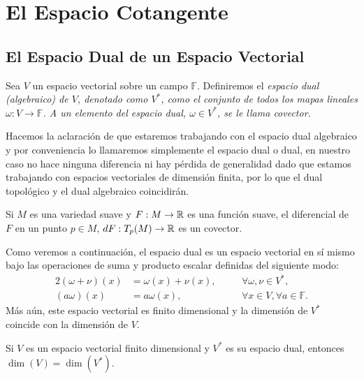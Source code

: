 \section{El Espacio Cotangente}\label{Sección: Espacio Cotangente}
\subsection{El Espacio Dual de un Espacio Vectorial}

\begin{definition}
	Sea $V$ un espacio vectorial sobre un campo $\mathbb{F}$. Definiremos el \it{espacio dual (algebraico) de $V$}, denotado como $V^*$, como el conjunto de todos los mapas lineales $\omega: V \to \mathbb{F}$. A un elemento del espacio dual, $\omega \in V^*$, se le llama \it{covector}.
\end{definition}

Hacemos la aclaración de que estaremos trabajando con el espacio dual algebraico y por conveniencia lo llamaremos simplemente el espacio dual o dual, en nuestro caso no hace ninguna diferencia ni hay pérdida de generalidad dado que estamos trabajando con espacios vectoriales de dimensión finita, por lo que el dual topológico y el dual algebraico coincidirán.

\begin{example}
	Si $M$ es una variedad suave y $F: M \to \mathbb{R}$ es una función suave, el diferencial de $F$ en un punto $p \in M$, $dF: T_p(M) \to \mathbb{R}$ es un covector.
\end{example}

Como veremos a continuación, el espacio dual es un espacio vectorial en sí mismo bajo las operaciones de suma y producto escalar definidas del siguiente modo:
\begin{alignat*}{2}
	(\omega+\nu)(x) & =\omega(x)+\nu(x), \quad &  & \forall \omega,\nu \in V^{*},           \\
	(a\omega)(x)    & = a\omega(x), \quad      &  & \forall x\in V,\forall a \in\mathbb{F}.
\end{alignat*}
Más aún, este espacio vectorial es finito dimensional y la dimensión de $V^{*}$ coincide con la dimensión de $V$.

\begin{theorem}\label{Teorema: Dimensión del Espacio Dual}
	Si $V$ es un espacio vectorial finito dimensional y $V^{*}$ es su espacio dual, entonces $\dim(V) = \dim(V^{*})$.
\end{theorem}

